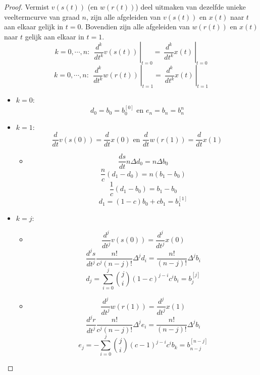 \documentclass[examenvragen.tex]{subfiles}
\begin{document}
\begin{proof}
Vermist $v(s(t))$ (en $w(r(t))$) deel uitmaken van dezelfde unieke veeltermcurve van graad $n$, zijn alle afgeleiden van $v(s(t))$ en $x(t)$ naar $t$ aan elkaar gelijk in $t=0$. Bovendien zijn alle afgeleiden van $w(r(t))$ en $x(t)$ naar $t$ gelijk aan elkaar in $t=1$.
\[
k = 0,\cdots,n:\
\left.\ \frac{d^{k}}{dt^{k}}v(s(t))\ \right|_{t=0} = \left.\  \frac{d^{k}}{dt^{k}}x(t)\ \right|_{t=0} 
\] 
\[
k = 0,\cdots,n:\
\left.\ \frac{d^{k}}{dt^{k}}w(r(t))\ \right|_{t=1} = \left.\  \frac{d^{k}}{dt^{k}}x(t)\ \right|_{t=1} 
\] 

\begin{itemize}
\item $k=0$:
\[
d_0 = b_0 =b_0^{[0]} \text{ en } e_n = b_n = b_{n}^{n}
\]

\item $k=1$:
\[
\frac{d}{dt}v(s(0)) = \frac{d}{dt}x(0) \text{ en } \frac{d}{dt}w(r(1)) = \frac{d}{dt}x(1)
\]
\begin{itemize}
\item
\[
\frac{ds}{dt}n\Delta d_0 = n\Delta b_0
\]
\[
\frac{n}{c}(d_1-d_0) = n(b_1-b_0)
\]
\[
\frac{1}{c}(d_1-b_0) = b_1-b_0
\]
\[
d_1 = (1-c)b_0+cb_1 = b_1^{[1]}
\]

\end{itemize}

\item $k=j$:
\begin{itemize}
\item
\[
\frac{d^{j}}{dt^{j}}v(s(0)) = \frac{d^{j}}{dt^{j}}x(0)
\]
\[
\frac{d^{j}s}{dt^{j}}\frac{n!}{c^j(n-j)!}\Delta^{j}d_i
= \frac{n!}{(n-j)!}\Delta^{j}b_i
\]
\[
d_{j} = \sum_{i=0}^j{j \choose i}(1-c)^{j-i}c^ib_i= b_j^{[j]}
\]

\item
\[
\frac{d^{j}}{dt^{j}}w(r(1)) = \frac{d^{j}}{dt^{j}}x(1)
\]
\[
\frac{d^{j}r}{dt^{j}}\frac{n!}{c^j(n-j)!}\Delta^{j}e_i
= \frac{n!}{(n-j)!}\Delta^{j}b_i
\]
\[
e_{j} = -\sum_{i=0}^j{j \choose i}(c-1)^{j-i}c^ib_k= b_{n-j}^{[n-j]}
\]
\end{itemize}
\end{itemize}
\end{proof}
\end{document}
